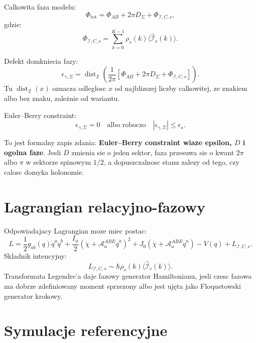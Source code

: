 \documentclass[11pt,a4paper]{article}
\newcommand{\Iop}{\hat{\mathcal I}}
\newcommand{\Abe}{\mathcal A^{ABE}}
\begin{document}
Calkowita faza modelu:
\begin{equation}
\Phi_{\mathrm{tot}}
=
\Phi_{AB}+2\pi D_\Sigma+\Phi_{\mathcal I,C,s},
\end{equation}
gdzie:
\begin{equation}
\Phi_{\mathcal I,C,s}
=
\sum_{k=0}^{K-1}\rho_s(k)\langle\Iop_s(k)\rangle.
\end{equation}

Defekt domkniecia fazy:
\begin{equation}
\boxed{
\epsilon_{\gamma,\Sigma}
=
\operatorname{dist}_{\mathbb Z}\left(
\frac{1}{2\pi}
\left[
\Phi_{AB}+2\pi D_\Sigma+\Phi_{\mathcal I,C,s}
\right]
\right).}
\end{equation}
Tu $\operatorname{dist}_{\mathbb Z}(x)$ oznacza odleglosc $x$ od najblizszej liczby calkowitej, ze znakiem albo bez znaku, zależnie od wariantu.

Euler--Berry constraint:
\begin{equation}
\boxed{
\epsilon_{\gamma,\Sigma}=0
\quad\text{albo roboczo}\quad
|\epsilon_{\gamma,\Sigma}|\le\epsilon_\star.}
\end{equation}

To jest formalny zapis zdania: \textbf{Euler--Berry constraint wiaze epsilon, $D$ i ogolna faze}. Jesli $D$ zmienia sie o jeden sektor, faza przesuwa sie o kwant $2\pi$ albo $\pi$ w sektorze spinowym $1/2$, a dopuszczalnosc stanu zalezy od tego, czy calosc domyka holonomie.

\section{Lagrangian relacyjno-fazowy}

Odpowiadajacy Lagrangian moze miec postac:
\begin{equation}
L
=
\frac12g_{ab}(q)\dot q^a\dot q^b
+
\frac{I_\phi}{2}\left(\dot\chi+\Abe_a\dot q^a\right)^2
+J_0\left(\dot\chi+\Abe_a\dot q^a\right)
-V(q)
+L_{\mathcal I,C,s}.
\end{equation}
Skladnik intencyjny:
\begin{equation}
L_{\mathcal I,C,s}
\sim
\hbar\rho_s(k)\langle\Iop_s(k)\rangle.
\end{equation}
Transformata Legendre'a daje fazowy generator Hamiltonianu, jesli czesc fazowa ma dobrze zdefiniowany moment sprzezony albo jest ujęta jako Floquetowski generator krokowy.

\section{Symulacje referencyjne}
\end{document}
